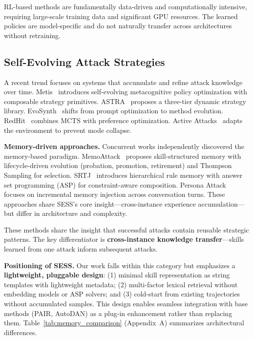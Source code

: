 \documentclass{article} %
\begin{document}
RL-based methods are fundamentally data-driven and computationally intensive, requiring large-scale training data and significant GPU resources. The learned policies are model-specific and do not naturally transfer across architectures without retraining.

\subsection{Self-Evolving Attack Strategies}

A recent trend focuses on systems that accumulate and refine attack knowledge over time. Metis~\citep{chen2026metis} introduces self-evolving metacognitive policy optimization with composable strategy primitives. ASTRA~\citep{liu2026astra} proposes a three-tier dynamic strategy library. EvoSynth~\citep{chen2025evosynth} shifts from prompt optimization to method evolution. RedHit~\citep{sorkhpour2025redhit} combines MCTS with preference optimization. Active Attacks~\citep{yun2025active} adapts the environment to prevent mode collapse.

\textbf{Memory-driven approaches.} Concurrent works independently discovered the memory-based paradigm. MemoAttack~\citep{zhang2026memoattack} proposes skill-structured memory with lifecycle-driven evolution (probation, promotion, retirement) and Thompson Sampling for selection. SRTJ~\citep{li2026srtj} introduces hierarchical rule memory with answer set programming (ASP) for constraint-aware composition. Persona Attack~\citep{park2026personattack} focuses on incremental memory injection across conversation turns. These approaches share SESS's core insight---cross-instance experience accumulation---but differ in architecture and complexity.

These methods share the insight that successful attacks contain reusable strategic patterns. The key differentiator is \textbf{cross-instance knowledge transfer}---skills learned from one attack inform subsequent attacks.

\textbf{Positioning of SESS.} Our work falls within this category but emphasizes a \textbf{lightweight, pluggable design}: (1) minimal skill representation as string templates with lightweight metadata; (2) multi-factor lexical retrieval without embedding models or ASP solvers; and (3) cold-start from existing trajectories without accumulated samples. This design enables seamless integration with base methods (PAIR, AutoDAN) as a plug-in enhancement rather than replacing them. Table~\ref{tab:memory_comparison} (Appendix~A) summarizes architectural differences.
\end{document}
